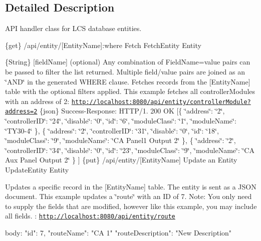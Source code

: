\subsection{Detailed Description}
A\+PI handler class for L\+CS database entities. 

\{get\} /api/entity/\mbox{[}Entity\+Name\mbox{]}\+:where Fetch  Fetch\+Entity  Entity

\{String\} \mbox{[}field\+Name\mbox{]} (optional) Any combination of Field\+Name=value pairs can be passed to filter the list returned. Multiple field/value pairs are joined as an \char`\"{}\+A\+N\+D\char`\"{} in the generated W\+H\+E\+RE clause.  Fetches records from the \mbox{[}Entity\+Name\mbox{]} table with the optional filters applied.  This example fetches all controller\+Modules with an address of 2\+: \href{http://localhost:8080/api/entity/controllerModule?address=2}{\tt http\+://localhost\+:8080/api/entity/controller\+Module?address=2}  \{json\} Success-\/\+Response\+: H\+T\+T\+P/1. 200 OK \mbox{[}\{ \char`\"{}address\char`\"{}\+: \char`\"{}2\char`\"{}, \char`\"{}controller\+I\+D\char`\"{}\+: \char`\"{}24\char`\"{}, \char`\"{}disable\char`\"{}\+: \char`\"{}0\char`\"{}, \char`\"{}id\char`\"{}\+: \char`\"{}6\char`\"{}, \char`\"{}module\+Class\char`\"{}\+: \char`\"{}1\char`\"{}, \char`\"{}module\+Name\char`\"{}\+: \char`\"{}\+T\+Y30-\/4\char`\"{} \}, \{ \char`\"{}address\char`\"{}\+: \char`\"{}2\char`\"{}, \char`\"{}controller\+I\+D\char`\"{}\+: \char`\"{}31\char`\"{}, \char`\"{}disable\char`\"{}\+: \char`\"{}0\char`\"{}, \char`\"{}id\char`\"{}\+: \char`\"{}18\char`\"{}, \char`\"{}module\+Class\char`\"{}\+: \char`\"{}9\char`\"{}, \char`\"{}module\+Name\char`\"{}\+: \char`\"{}\+C\+A Panel1 Output 2\char`\"{} \}, \{ \char`\"{}address\char`\"{}\+: \char`\"{}2\char`\"{}, \char`\"{}controller\+I\+D\char`\"{}\+: \char`\"{}34\char`\"{}, \char`\"{}disable\char`\"{}\+: \char`\"{}0\char`\"{}, \char`\"{}id\char`\"{}\+: \char`\"{}23\char`\"{}, \char`\"{}module\+Class\char`\"{}\+: \char`\"{}9\char`\"{}, \char`\"{}module\+Name\char`\"{}\+: \char`\"{}\+C\+A Aux Panel Output 2\char`\"{} \} \mbox{]}  \{put\} /api/entity/\mbox{[}Entity\+Name\mbox{]} Update an Entity  Update\+Entity  Entity

Updates a specific record in the \mbox{[}Entity\+Name\mbox{]} table. The entity is sent as a J\+S\+ON document.  This example updates a \char`\"{}route\char`\"{} with an ID of 7. Note\+: You only need to supply the fields that are modified, however like this example, you may include all fields. \+: \href{http://localhost:8080/api/entity/route}{\tt http\+://localhost\+:8080/api/entity/route} \begin{DoxyVerb}body:
{
  "id": 7,
  "routeName": "CA 1"
  "routeDescription": "New Description"
}\end{DoxyVerb}



